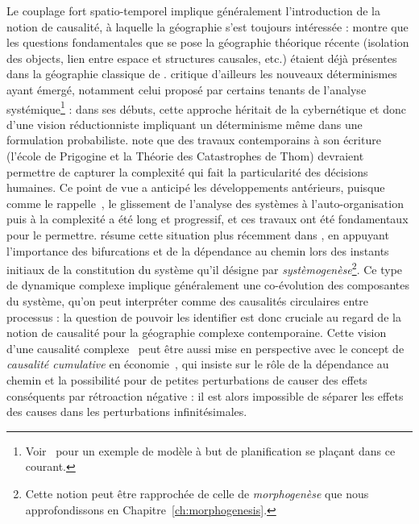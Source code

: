 {Le couplage fort spatio-temporel implique généralement l'introduction de la notion de causalité, à laquelle la géographie s'est toujours intéressée : \cite{loi1985etude} montre que les questions fondamentales que se pose la géographie théorique récente (isolation des objects, lien entre espace et structures causales, etc.) étaient déjà présentes dans la géographie classique de . \cite{claval1985causalite} critique d'ailleurs les nouveaux déterminismes ayant émergé, notamment celui proposé par certains tenants de l'analyse systémique\footnote{Voir~\cite{chamussy1984dynamique} pour un exemple de modèle à but de planification se plaçant dans ce courant.} : dans ses débuts, cette approche héritait de la cybernétique et donc d'une vision réductionniste impliquant un déterminisme même dans une formulation probabiliste.  note que des travaux contemporains à son écriture (l'école de Prigogine et la Théorie des Catastrophes de Thom) devraient permettre de capturer la complexité qui fait la particularité des décisions humaines. Ce point de vue a anticipé les développements antérieurs, puisque comme le rappelle~\cite{pumain2003approche}, le glissement de l'analyse des systèmes à l'auto-organisation puis à la complexité a été long et progressif, et ces travaux ont été fondamentaux pour le permettre.  résume cette situation plus récemment dans \cite{durand2003geographes}, en appuyant l'importance des bifurcations et de la dépendance au chemin lors des instants initiaux de la constitution du système qu'il désigne par \emph{systèmogenèse}\footnote{Cette notion peut être rapprochée de celle de \emph{morphogenèse} que nous approfondissons en Chapitre~\ref{ch:morphogenesis}.}. Ce type de dynamique complexe implique généralement une co-évolution des composantes du système, qu'on peut interpréter comme des causalités circulaires entre processus : la question de pouvoir les identifier est donc cruciale au regard de la notion de causalité pour la géographie complexe contemporaine. Cette vision d'une causalité complexe~\cite{morin1976methode} peut être aussi mise en perspective avec le concept de \emph{causalité cumulative} en économie~\cite{skott1995cumulative}, qui insiste sur le rôle de la dépendance au chemin et la possibilité pour de petites perturbations de causer des effets conséquents par rétroaction négative : il est alors impossible de séparer les effets des causes dans les perturbations infinitésimales.
}



